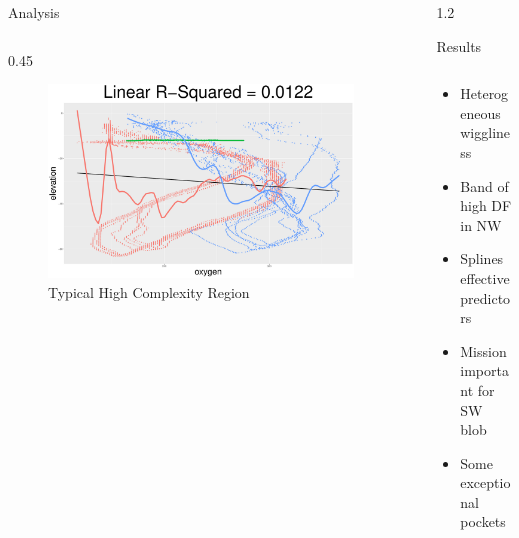 \documentclass[final]{beamer}
\newlength{\sepwidth}
\newlength{\colwidth}
\newcommand{\separatorcolumn}{\begin{column}{\sepwidth}\end{column}}
\begin{document}
\begin{frame}[t]
\begin{columns}[t]
\begin{column}{\colwidth}
\begin{block}{Analysis}
\begin{columns}[t]
      \begin{column}{0.45 \colwidth}
      \begin{figure}
        \centering
      \includegraphics[width= \textwidth]{Figures/low_linear_R2.pdf}   
      \vspace{-60pt}
        \caption{Typical High Complexity Region}
    \end{figure}
      \end{column}
      
  \end{columns}
    

\end{block}

\end{column}

\separatorcolumn






\begin{column}{1.2\colwidth}
\vspace{-30pt}


  \begin{block}{Results}

  \begin{columns}[t]
      \begin{column}{0.48 \textwidth}
    \vspace{-30pt}
    \vspace{-10pt}
          \begin{itemize}
              \item Heterogeneous wiggliness
              \item Band of high DF in NW \newline
              \vspace{-20pt}
              \item Splines effective predictors
              \item Mission important for SW blob
              \item Some exceptional pockets
          \end{itemize}


\end{column}
\end{columns}
\end{block}
\end{column}
\end{columns}
\end{frame}
\end{document}
